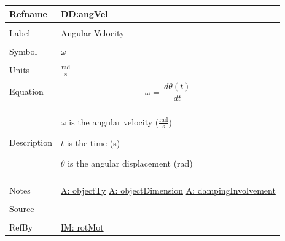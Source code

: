 \documentclass[12pt]{article}
\begin{document}
\noindent \begin{minipage}{\textwidth}
          \begin{tabular}{>{\raggedright}p{}>{\raggedright\arraybackslash}p{}}
          \toprule \textbf{Refname} & \textbf{DD:angVel}
          \label{DD:angVel}
          \\ \midrule \\
          Label & Angular Velocity
          \\ \midrule \\
          Symbol & $ω$
          \\ \midrule \\
          Units & $\frac{\text{rad}}{\text{s}}$
          \\ \midrule \\
          Equation & \begin{displaymath}
                     ω=\frac{\,dθ\left(t\right)}{\,dt}
                     \end{displaymath}
          \\ \midrule \\
          Description & \begin{symbDescription}
                        \item{$ω$ is the angular velocity ($\frac{\text{rad}}{\text{s}}$)}
                        \item{$t$ is the time (s)}
                        \item{$θ$ is the angular displacement (rad)}
                        \end{symbDescription}
          \\ \midrule \\
          Notes & \hyperref[assumpOT]{A: objectTy}
                  \hyperref[assumpOD]{A: objectDimension}
                  \hyperref[assumpDI]{A: dampingInvolvement}
          \\ \midrule \\
          Source & --
          \\ \midrule \\
          RefBy & \hyperref[IM:rotMot]{IM: rotMot}
          \\ \bottomrule
          \end{tabular}
          \end{minipage}
\par~
\end{document}
